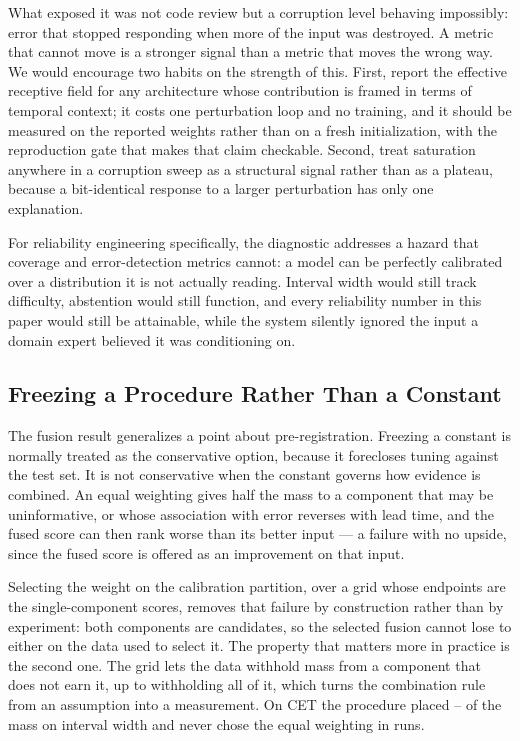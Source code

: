 What exposed it was not code review but a corruption level behaving impossibly: error that stopped responding when more of the input was destroyed. A metric that cannot move is a stronger signal than a metric that moves the wrong way. We would encourage two habits on the strength of this. First, report the effective receptive field for any architecture whose contribution is framed in terms of temporal context; it costs one perturbation loop and no training, and it should be measured on the reported weights rather than on a fresh initialization, with the reproduction gate that makes that claim checkable. Second, treat saturation anywhere in a corruption sweep as a structural signal rather than as a plateau, because a bit-identical response to a larger perturbation has only one explanation.

For reliability engineering specifically, the diagnostic addresses a hazard that coverage and error-detection metrics cannot: a model can be perfectly calibrated over a distribution it is not actually reading. Interval width would still track difficulty, abstention would still function, and every reliability number in this paper would still be attainable, while the system silently ignored the input a domain expert believed it was conditioning on.

\subsection{Freezing a Procedure Rather Than a Constant}
The fusion result generalizes a point about pre-registration. Freezing a constant is normally treated as the conservative option, because it forecloses tuning against the test set. It is not conservative when the constant governs how evidence is combined. An equal weighting gives half the mass to a component that may be uninformative, or whose association with error reverses with lead time, and the fused score can then rank worse than its better input --- a failure with no upside, since the fused score is offered as an improvement on that input.

Selecting the weight on the calibration partition, over a grid whose endpoints are the single-component scores, removes that failure by construction rather than by experiment: both components are candidates, so the selected fusion cannot lose to either on the data used to select it. The property that matters more in practice is the second one. The grid lets the data withhold mass from a component that does not earn it, up to withholding all of it, which turns the combination rule from an assumption into a measurement. On CET the procedure placed \fusionWeightLow{}--\fusionWeightHigh{} of the mass on interval width and never chose the equal weighting in \fusionRuns{} runs.

